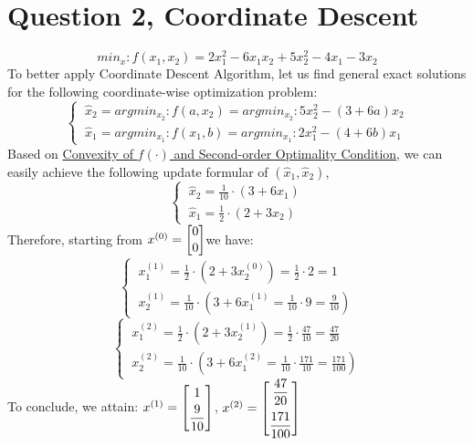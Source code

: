 \documentclass{article}
\begin{document}
\section{Question 2, Coordinate Descent}
\begin{equation}
	min_x: f(x_1,x_2) = 2x_1^2 - 6x_1x_2 + 5x_2^2-4x_1-3x_2
\end{equation}
To better apply Coordinate Descent Algorithm, let us find general exact solutions for the following coordinate-wise optimization problem:
\begin{equation}
	\nonumber
	\begin{cases}
	\ 	\hat{x}_2 = argmin_{x_2} :f(a,x_2) = argmin_{x_2}: 5x_2^2 -(3+6a)x_2 \\
	\ 	\hat{x}_1 = argmin_{x_1}: f(x_1, b) = argmin_{x_1}: 2x_1^2 - (4+6b) x_1
	\end{cases}
\end{equation}
Based on \underline{Convexity of $f(\cdot)$ and Second-order Optimality Condition}, we can easily achieve the following update formular of $(\hat{x}_1, \hat{x}_2)$,
\begin{equation}
	\nonumber
	\begin{cases}
		\ 	\hat{x}_2 = \frac{1}{10}\cdot(3+6x_1) \\
		\ 	\hat{x}_1 = \frac{1}{2}\cdot(2+3x_2)
	\end{cases}
\end{equation}
Therefore, starting from $x^{(0)} =\begin{bmatrix}
	0
	\vspace{1pt}
	\\
	0
 \end{bmatrix}$we have:
\begin{equation}
	\nonumber
	\begin{cases}
		\ 	x_1^{(1)} = \frac{1}{2}\cdot(2+3x_2^{(0)}) =  \frac{1}{2} \cdot 2 =1 \\
		\ 	x_2^{(1)} = \frac{1}{10}\cdot(3+6x_1^{(1)} = \frac{1}{10} \cdot 9 = \frac{9}{10})
	\end{cases}
\end{equation}
\begin{equation}
	\nonumber
	\begin{cases}
		\ 	x_1^{(2)} = \frac{1}{2}\cdot(2+3x_2^{(1)}) =  \frac{1}{2} \cdot \frac{47}{10} =\frac{47}{20} \\
		\ 	x_2^{(2)} = \frac{1}{10}\cdot(3+6x_1^{(2)} = \frac{1}{10} \cdot \frac{171}{10} = \frac{171}{100})
	\end{cases}
\end{equation}
To conclude, we attain: $x^{(1)} =\begin{bmatrix}
	1
	\vspace{3pt}
	\\
	\dfrac{9}{10}
\end{bmatrix}$, $x^{(2)} = \begin{bmatrix}
\dfrac{47}{20}
\vspace{6pt}
\\
\dfrac{171}{100}
\end{bmatrix}$
\end{document}
